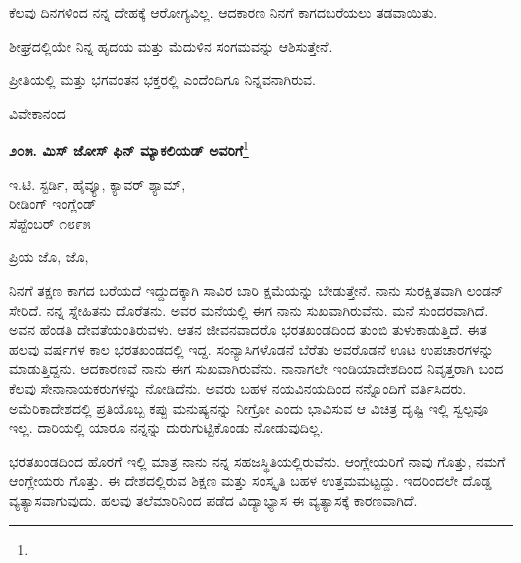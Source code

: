 \vspace{0.1cm}

ಕೆಲವು ದಿನಗಳಿಂದ ನನ್ನ ದೇಹಕ್ಕೆ ಆರೋಗ್ಯವಿಲ್ಲ. ಆದಕಾರಣ ನಿನಗೆ ಕಾಗದ\break ಬರೆಯಲು ತಡವಾಯಿತು.

\vspace{0.1cm}

ಶೀಘ್ರದಲ್ಲಿಯೇ ನಿನ್ನ ಹೃದಯ ಮತ್ತು ಮೆದುಳಿನ ಸಂಗಮವನ್ನು ಆಶಿಸುತ್ತೇನೆ.

\vspace{0.1cm}

ಪ್ರೀತಿಯಲ್ಲಿ ಮತ್ತು ಭಗವಂತನ ಭಕ್ತರಲ್ಲಿ ಎಂದೆಂದಿಗೂ ನಿನ್ನವನಾಗಿರುವ.

\vspace{-0.4cm}

{\flushright
ವಿವೇಕಾನಂದ\par}

\begin{center}
\textbf{೨೦೫. ಮಿಸ್ ಜೋಸ್ ಫಿನ್ ಮ್ಯಾಕಲಿಯಡ್ ಅವರಿಗೆ}\footnote{}
\end{center}

\vspace{-0.4cm}

\begin{flushright}
ಇ.ಟಿ. ಸ್ಟರ್ಡಿ, ಹೈವ್ಯೂ, ಕ್ಯಾವರ್ ಶ್ಯಾಮ್,\\ರೀಡಿಂಗ್ ಇಂಗ್ಲೆಂಡ್\\ಸೆಪ್ಟೆಂಬರ್ ೧೮೯೫
\end{flushright}
\vspace{-0.3cm}

\noindent
ಪ್ರಿಯ ಜೊ, ಜೊ,

\vspace{0.1cm}

ನಿನಗೆ ತಕ್ಷಣ ಕಾಗದ ಬರೆಯದೆ ಇದ್ದುದಕ್ಕಾಗಿ ಸಾವಿರ ಬಾರಿ ಕ್ಷಮೆಯನ್ನು ಬೇಡುತ್ತೇನೆ. ನಾನು ಸುರಕ್ಷಿತವಾಗಿ ಲಂಡನ್ ಸೇರಿದೆ. ನನ್ನ ಸ್ನೇಹಿತನು ದೊರೆತನು. ಅವರ ಮನೆಯಲ್ಲಿ ಈಗ ನಾನು ಸುಖವಾಗಿರುವೆನು. ಮನೆ ಸುಂದರವಾಗಿದೆ. ಅವನ ಹೆಂಡತಿ ದೇವತೆಯಂತಿರುವಳು. ಆತನ ಜೀವನವಾದರೊ ಭರತಖಂಡದಿಂದ ತುಂಬಿ ತುಳುಕಾಡುತ್ತಿದೆ. ಈತ ಹಲವು ವರ್ಷಗಳ ಕಾಲ ಭರತಖಂಡದಲ್ಲಿ ಇದ್ದ. ಸಂನ್ಯಾಸಿಗಳೊಡನೆ ಬೆರೆತು ಅವರೊಡನೆ ಊಟ ಉಪಚಾರಗಳನ್ನು ಮಾಡುತ್ತಿದ್ದನು. ಆದಕಾರಣವೆ ನಾನು ಈಗ ಸುಖವಾಗಿರುವೆನು. ನಾನಾಗಲೇ ಇಂಡಿಯಾದೇಶದಿಂದ ನಿವೃತ್ತರಾಗಿ ಬಂದ ಕೆಲವು ಸೇನಾನಾಯಕರುಗಳನ್ನು ನೋಡಿದೆನು. ಅವರು ಬಹಳ ನಯವಿನಯದಿಂದ ನನ್ನೊಂದಿಗೆ ವರ್ತಿಸಿದರು. ಅಮೆರಿಕಾದೇಶದಲ್ಲಿ ಪ್ರತಿಯೊಬ್ಬ ಕಪ್ಪು ಮನುಷ್ಯನನ್ನು ನೀಗ್ರೋ ಎಂದು ಭಾವಿಸುವ ಆ ವಿಚಿತ್ರ ದೃಷ್ಟಿ ಇಲ್ಲಿ ಸ್ವಲ್ಪವೂ ಇಲ್ಲ. ದಾರಿಯಲ್ಲಿ ಯಾರೂ ನನ್ನನ್ನು ದುರುಗುಟ್ಟಿಕೊಂಡು ನೋಡುವುದಿಲ್ಲ.

\vspace{0.1cm}

ಭರತಖಂಡದಿಂದ ಹೊರಗೆ ಇಲ್ಲಿ ಮಾತ್ರ ನಾನು ನನ್ನ ಸಹಜಸ್ಥಿತಿಯಲ್ಲಿರುವೆನು. ಆಂಗ್ಲೇಯರಿಗೆ ನಾವು ಗೊತ್ತು, ನಮಗೆ ಆಂಗ್ಲೇಯರು ಗೊತ್ತು. ಈ ದೇಶದಲ್ಲಿರುವ ಶಿಕ್ಷಣ ಮತ್ತು ಸಂಸ್ಕೃತಿ ಬಹಳ ಉತ್ತಮಮಟ್ಟದ್ದು. ಇದರಿಂದಲೇ ದೊಡ್ಡ ವ್ಯತ್ಯಾಸವಾಗುವುದು. ಹಲವು ತಲೆಮಾರಿನಿಂದ ಪಡೆದ ವಿದ್ಯಾಭ್ಯಾಸ ಈ ವ್ಯತ್ಯಾಸಕ್ಕೆ ಕಾರಣವಾಗಿದೆ.

